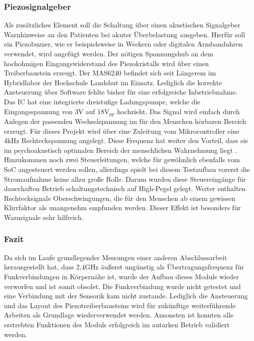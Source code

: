 \documentclass[12pt]{scrreprt} %
\begin{document}
\subsubsection{Piezosignalgeber}
Als zusätzliches Element soll die Schaltung über einen akustischen Signalgeber Warnhinweise an den Patienten bei akuter Überbelastung ausgeben. Hierfür soll ein Piezobuzzer, wie er beispielsweise in Weckern oder digitalen Armbanduhren verwendet, wird angefügt werden. Der nötigen Spannungshub an dem hochohmigen Eingangswiderstand des Piezokristalls wird über einen Treiberbaustein erzeugt. Der MAS6240 befindet sich seit Längerem im Hybridlabor der Hochschule Landshut im Einsatz. Lediglich die korrekte Ansteuerung über Software fehlte bisher für eine erfolgreiche Inbetriebnahme. Das IC hat eine integrierte dreistufige Ladungspumpe, welche die Eingangsspannung von 3V auf 18$\text{V}_{pp}$ hochzieht. Das Signal wird einfach durch Anlegen der passenden Wechselspannung im für den Menschen hörbaren Bereich erzeugt. Für dieses Projekt wird über eine Zuleitung vom Mikrocontroller eine 4kHz Rechteckspannung angelegt. Diese Frequenz hat weiter den Vorteil, dass sie im psychoakustisch optimalen Bereich der menschlichen Wahrnehmung liegt \citep{Psych}. Hinzukommen noch zwei Steuerleitungen, welche für gewöhnlich ebenfalls vom SoC angesteuert werden sollen, allerdings spielt bei diesem Testaufbau vorerst die Stromaufnahme keine allzu große Rolle. Darum wurden diese Steuereingänge für dauerhaften Betrieb schaltungstechnisch auf High-Pegel gelegt. Weiter enthalten Rechtecksignale Oberschwingungen, die für den Menschen ab einem gewissen Klirrfaktor als unangenehm empfunden werden. Dieser Effekt ist besonders für Warnsignale sehr hilfreich.
\subsubsection{Fazit}
Da sich im Laufe grundlegender Messungen einer anderen Abschlussarbeit herausgestellt hat, dass 2,4GHz äußerst ungünstig als Übertragungsfrequenz für Funkverbindungen in Körpernähe ist, wurde der Aufbau dieses Moduls wieder verworfen und ist somit obsolet. Die Funkverbindung wurde nicht getestet und eine Verbindung mit der Sensorik kam nicht zustande. Lediglich die Ansteuerung und das Layout des Piezotreiberbausteins  wird für zukünftige weiterführende Arbeiten als Grundlage wiederverwendet werden. Ansonsten ist konnten alle erstrebten Funktionen des Moduls erfolgreich im autarken Betrieb validiert werden.
\end{document}
